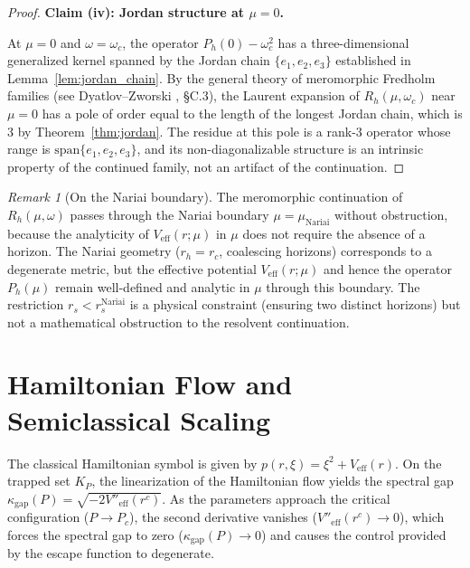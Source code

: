 \documentclass[12pt,a4paper]{amsart}
\theoremstyle{remark}
\newtheorem{remark}[theorem]{Remark}
\begin{document}
\begin{proof}
\medskip
\noindent\textbf{Claim (iv): Jordan structure at $\mu = 0$.}

At $\mu = 0$ and $\omega = \omega_c$, the operator $P_h(0) - \omega_c^2$
has a three-dimensional generalized kernel spanned by the Jordan chain
$\{e_1, e_2, e_3\}$ established in Lemma~\ref{lem:jordan_chain}. By the
general theory of meromorphic Fredholm families (see Dyatlov--Zworski
\cite{DZ19}, \S C.3), the Laurent expansion of $R_h(\mu, \omega_c)$
near $\mu = 0$ has a pole of order equal to the length of the longest
Jordan chain, which is $3$ by Theorem~\ref{thm:jordan}. The residue
at this pole is a rank-$3$ operator whose range is
$\mathrm{span}\{e_1,e_2,e_3\}$, and its non-diagonalizable structure
is an intrinsic property of the continued family, not an artifact of
the continuation.
\end{proof}

\begin{remark}[On the Nariai boundary]
\label{rem:nariai_boundary}
The meromorphic continuation of $R_h(\mu,\omega)$ passes through the
Nariai boundary $\mu = \mu_{\mathrm{Nariai}}$ without obstruction,
because the analyticity of $V_{\mathrm{eff}}(r;\mu)$ in $\mu$ does not
require the absence of a horizon. The Nariai geometry ($r_h = r_c$,
coalescing horizons) corresponds to a degenerate metric, but the
effective potential $V_{\mathrm{eff}}(r;\mu)$ and hence the operator
$P_h(\mu)$ remain well-defined and analytic in $\mu$ through this
boundary. The restriction $r_s < r_s^{\mathrm{Nariai}}$ is a physical
constraint (ensuring two distinct horizons) but not a mathematical
obstruction to the resolvent continuation.
\end{remark}

\section{Hamiltonian Flow and Semiclassical Scaling}

The classical Hamiltonian symbol is given by $p(r,\xi) = \xi^2 + V_{\mathrm{eff}}(r)$. On the trapped set $K_P$, the
linearization of the Hamiltonian flow yields the spectral gap
$\kappa_{\mathrm{gap}}(P) = \sqrt{-2V''_{\mathrm{eff}}(r^c)}$. As the parameters approach the critical configuration ($P \to P_c$),
the second derivative vanishes ($V''_{\mathrm{eff}}(r^c) \to 0$), which forces the spectral gap to zero
($\kappa_{\mathrm{gap}}(P) \to 0$) and causes the control provided by the escape function to degenerate.
\end{document}
